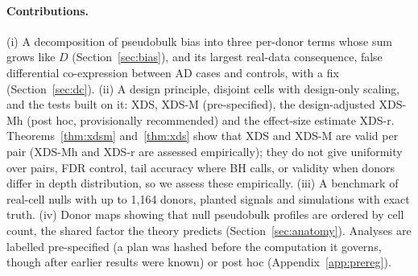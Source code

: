 \documentclass[10pt,letterpaper]{article}
\theoremstyle{definition}
\theoremstyle{remark}
\begin{document}
\paragraph{Contributions.} (i) A decomposition of pseudobulk bias into three per-donor terms whose sum grows like $D$ (Section~\ref{sec:bias}), and its largest real-data consequence, false differential co-expression between AD cases and controls, with a fix (Section~\ref{sec:dc}). (ii) A design principle, disjoint cells with design-only scaling, and the tests built on it: XDS, XDS-M (pre-specified), the design-adjusted XDS-Mh (post hoc, provisionally recommended) and the effect-size estimate XDS-r. Theorems~\ref{thm:xdsm} and~\ref{thm:xds} show that XDS and XDS-M are valid per pair (XDS-Mh and XDS-r are assessed empirically); they do not give uniformity over pairs, FDR control, tail accuracy where BH calls, or validity when donors differ in depth distribution, so we assess these empirically. (iii) A benchmark of real-cell nulls with up to 1{,}164 donors, planted signals and simulations with exact truth. (iv) Donor maps showing that null pseudobulk profiles are ordered by cell count, the shared factor the theory predicts (Section~\ref{sec:anatomy}). Analyses are labelled pre-specified (a plan was hashed before the computation it governs, though after earlier results were known) or post hoc (Appendix~\ref{app:prereg}).
\end{document}
